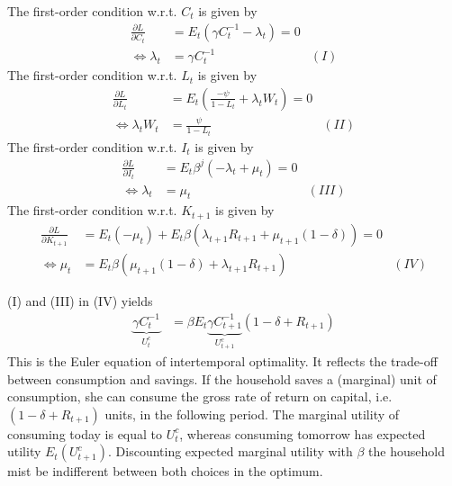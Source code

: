 \documentclass[a4paper]{scrartcl}
\begin{document}
\begin{enumerate}
\begin{solution}
		The first-order condition w.r.t. $C_t$ is given by
		\begin{align*}
		\frac{\partial L}{\partial C_{t}} &= E_t \left(\gamma C_t^{-1}-\lambda_{t}\right) = 0\\
		\Leftrightarrow \lambda_{t} &= \gamma C_{t}^{-1} & (I)
		\end{align*}
		The first-order condition w.r.t. $L_t$ is given by
		\begin{align*}
		\frac{\partial L}{\partial L_{t}} &= E_t \left(\frac{-\psi}{1-L_{t}}+\lambda_{t} W_{t}\right) = 0\\
		\Leftrightarrow \lambda_{t} W_{t} &= \frac{\psi}{1-L_{t}} &(II)
		\end{align*}
		The first-order condition w.r.t. $I_{t}$ is given by
		\begin{align*}
		\frac{\partial L}{\partial I_{t}} &= E_t \beta^j \left(-\lambda_{t} + \mu_{t}\right) = 0\\
		\Leftrightarrow \lambda_{t} &= \mu_{t} & (III)
		\end{align*}
		The first-order condition w.r.t. $K_{t+1}$ is given by
		\begin{align*}
		\frac{\partial L}{\partial K_{t+1}} &= E_t (-\mu_{t}) + 
		E_t \beta \left(\lambda_{t+1}R_{t+1}+\mu_{t+1}(1-\delta)\right) = 0\\
		\Leftrightarrow \mu_{t} &= E_t \beta(\mu_{t+1}(1-\delta)+\lambda_{t+1}R_{t+1}) & (IV)
		\end{align*}
		
		(I) and (III) in (IV) yields
		\begin{align*}
		\underbrace{\gamma C_t^{-1}}_{U_t^c} &= \beta E_t \underbrace{\gamma C_{t+1}^{-1}}_{U_{t+1}^c}\left(1-\delta + R_{t+1}\right)
		\end{align*}
		This is the Euler equation of intertemporal optimality. It reflects the trade-off between consumption and savings. If the household saves a (marginal) unit of consumption, she can consume the gross rate of return on capital, i.e. $(1-\delta+R_{t+1})$ units, in the following period. The marginal utility of consuming today is equal to $U_t^c$, whereas consuming tomorrow has expected utility $E_t(U_{t+1}^c)$. Discounting expected marginal utility with $\beta$ the household mist be indifferent between both choices in the optimum.
		

\end{solution}
\end{enumerate}
\end{document}
